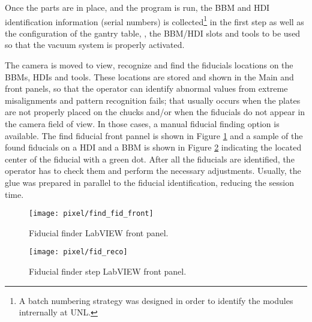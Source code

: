 Once the parts are in place, and the program is run, the BBM and HDI identification information (serial numbers) is collected\footnote{A batch numbering strategy was designed in order to identify the modules intrernally at UNL.} in the first step as well as the configuration of the gantry table, \ie, the BBM/HDI slots and tools to be used so that the vacuum system is properly activated. 

The camera is moved to view, recognize and find the fiducials locations on the BBMs, HDIs and tools. These locations are stored and shown in the Main and  front panels, so that the operator can identify abnormal values from extreme misalignments and pattern recognition fails; that usually occurs when the plates are not properly placed on the chucks and/or when the fiducials do not appear in the camera field of view. In those cases, a manual fiducial finding option is available. The find fiducial front pannel is shown in Figure \ref{fig:find_fid_front} and a sample of the found fiducials on a HDI and a BBM is shown in Figure \ref{fig:fid_reco} indicating the located center of the fiducial with a green dot. After all the fiducials are identified, the operator has to check them and perform the necessary adjustments. Usually, the glue was prepared in parallel to the fiducial identification, reducing the session time.  

\begin{landscape}
\begin{figure}[h]
\begin{center}
    \vspace{-2.9cm}
    \hspace{-1cm}
    \texttt{[image: pixel/find\_fid\_front]}
    \caption[Fiducial finder LabVIEW front panel]{Fiducial finder LabVIEW front panel.}\label{fig:find_fid_front}
    \vspace{-2cm}
    \hspace{-2cm}
\end{center}
\end{figure}
\end{landscape}


\begin{figure}[h]
\begin{center}
 \texttt{[image: pixel/fid\_reco]}
 \caption[Fiducial finder step LabVIEW front panel]{Fiducial finder step LabVIEW front panel.}\label{fig:fid_reco}
\end{center}
\end{figure}

